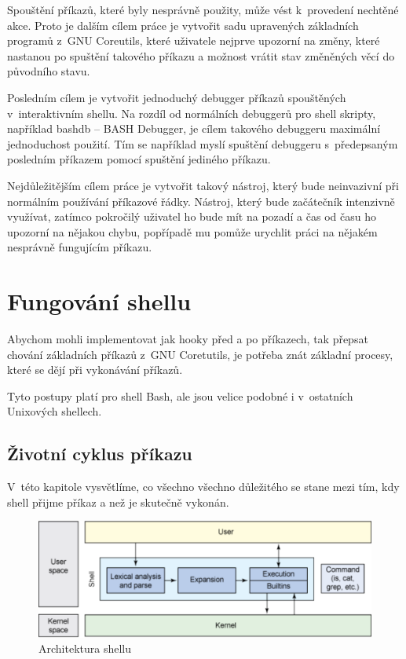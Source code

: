 \documentclass[thesis=M,czech]{FITthesis}[2012/06/26]
\begin{document}
Spouštění příkazů, které byly nesprávně použity, může vést k~provedení nechtěné akce. Proto je dalším cílem práce je vytvořit sadu upravených základních programů z~GNU Coreutils, které uživatele nejprve upozorní na změny, které nastanou po spuštění takového příkazu a možnost vrátit stav změněných věcí do původního stavu.

Posledním cílem je vytvořit jednoduchý debugger příkazů spouštěných v~interaktivním shellu. Na rozdíl od normálních debuggerů pro shell skripty, například bashdb -- BASH Debugger, je cílem takového debuggeru maximální jednoduchost použití. Tím se například myslí spuštění debuggeru s~předepsaným posledním příkazem pomocí spuštění jediného příkazu.

Nejdůležitějším cílem práce je vytvořit takový nástroj, který bude neinvazivní při normálním používání příkazové řádky. Nástroj, který bude začátečník intenzivně využívat, zatímco pokročilý uživatel ho bude mít na pozadí a čas od času ho upozorní na nějakou chybu, popřípadě mu pomůže urychlit práci na nějakém nesprávně fungujícím příkazu.

%
%
%
\section{Fungování shellu}

Abychom mohli implementovat jak hooky před a po příkazech, tak přepsat chování základních příkazů z~GNU Coretutils, je potřeba znát základní procesy, které se dějí při vykonávání příkazů.

Tyto postupy platí pro shell Bash, ale jsou velice podobné i v~ostatních Unixových shellech.

%
%
%
\subsection{Životní cyklus příkazu}

V~této kapitole vysvětlíme, co všechno všechno důležitého se stane mezi tím, kdy shell přijme příkaz a než je skutečně vykonán.

\begin{figure}[htb]\centering
	\includegraphics[width=\textwidth]{./images/shell_arch2}
	\caption{Architektura shellu \cite{historyofshells}}
	\label{fig:shell_arch}
\end{figure}
\end{document}
